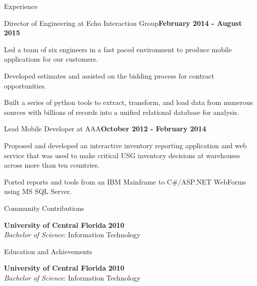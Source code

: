 \documentclass{resume} %
\begin{document}
\begin{rSection}{Experience}
\begin{rSubsection}{Director of Engineering at Echo Interaction Group}{\bf February 2014 - August 2015}{}{}
\item Led a team of six engineers in a fast paced environment to produce mobile applications for our customers.
\item Developed estimates and assisted on the bidding process for contract opportunities.
\item Built a series of python tools to extract, transform, and load data from numerous sources with billions of records into a unified relational database for analysis.


\end{rSubsection}


\begin{rSubsection}{Lead Mobile Developer at AAA}{\bf October 2012 - February 2014}{}{}

\item Proposed and developed an interactive inventory reporting application and web service that was used to make critical USG inventory decisions at warehouses across more than ten countries.
\item Ported reports and tools from an IBM Mainframe to C\#/ASP.NET WebForms using MS SQL Server.

\end{rSubsection}


\end{rSection}


\begin{rSection}{Community Contributions}

{\bf University of Central Florida} \hfill {\bf 2010} \\ 
{\it Bachelor of Science}: Information Technology \\
\end{rSection}


\begin{rSection}{Education and Achievements}

{\bf University of Central Florida} \hfill {\bf 2010} \\ 
{\it Bachelor of Science}: Information Technology \\
\end{rSection}
\end{document}
